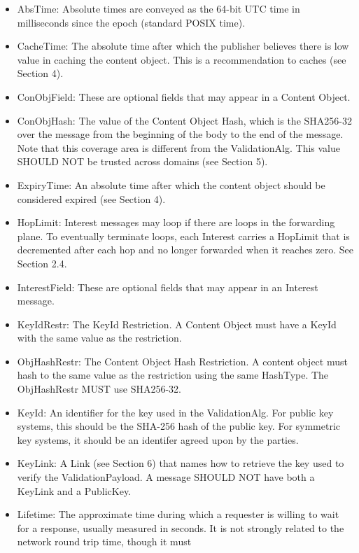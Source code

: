 \documentclass[12pt]{report}
\begin{document}
\begin{itemize}
\item AbsTime: Absolute times are conveyed as the 64-bit UTC time in
      milliseconds since the epoch (standard POSIX time).
\item CacheTime: The absolute time after which the publisher believes
      there is low value in caching the content object.  This is a
      recommendation to caches (see Section 4).
\item ConObjField: These are optional fields that may appear in a
      Content Object.
\item ConObjHash: The value of the Content Object Hash, which is the
   SHA256-32 over the message from the beginning of the body to the
   end of the message.  Note that this coverage area is different
   from the ValidationAlg.  This value SHOULD NOT be trusted across
   domains (see Section 5).
\item ExpiryTime: An absolute time after which the content object should
   be considered expired (see Section 4).
\item HopLimit: Interest messages may loop if there are loops in the
   forwarding plane.  To eventually terminate loops, each Interest
   carries a HopLimit that is decremented after each hop and no
   longer forwarded when it reaches zero.  See Section 2.4.
\item InterestField: These are optional fields that may appear in an
   Interest message.
\item KeyIdRestr: The KeyId Restriction.  A Content Object must have a
   KeyId with the same value as the restriction.
\item ObjHashRestr: The Content Object Hash Restriction.  A content
   object must hash to the same value as the restriction using the
   same HashType.  The ObjHashRestr MUST use SHA256-32.
\item KeyId: An identifier for the key used in the ValidationAlg.  For
   public key systems, this should be the SHA-256 hash of the public
   key.  For symmetric key systems, it should be an identifer agreed
   upon by the parties.
\item KeyLink: A Link (see Section 6) that names how to retrieve the key
   used to verify the ValidationPayload.  A message SHOULD NOT have
   both a KeyLink and a PublicKey.
\item Lifetime: The approximate time during which a requester is willing
   to wait for a response, usually measured in seconds.  It is not
   strongly related to the network round trip time, though it must

\end{itemize}
\end{document}
